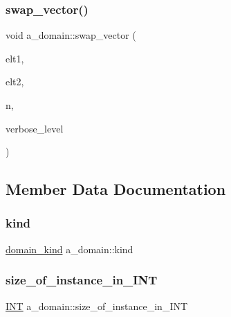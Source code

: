 \mbox{\label{classa__domain_a89310f090dde15d1fca545ae87aadcbc}} 
\subsubsection{\texorpdfstring{swap\+\_\+vector()}{swap\_vector()}}
{\footnotesize\ttfamily void a\+\_\+domain\+::swap\+\_\+vector (\begin{DoxyParamCaption}\item[{\mbox{\hyperlink{galois_8h_a09fddde158a3a20bd2dcadb609de11dc}{I\+NT}} $\ast$}]{elt1,  }\item[{\mbox{\hyperlink{galois_8h_a09fddde158a3a20bd2dcadb609de11dc}{I\+NT}} $\ast$}]{elt2,  }\item[{\mbox{\hyperlink{galois_8h_a09fddde158a3a20bd2dcadb609de11dc}{I\+NT}}}]{n,  }\item[{\mbox{\hyperlink{galois_8h_a09fddde158a3a20bd2dcadb609de11dc}{I\+NT}}}]{verbose\+\_\+level }\end{DoxyParamCaption})}



\subsection{Member Data Documentation}
\mbox{\label{classa__domain_ae171c12ea2d65d6d228a9dc957353359}} 
\subsubsection{\texorpdfstring{kind}{kind}}
{\footnotesize\ttfamily \mbox{\hyperlink{galois_8h_a3e2ab83f5066fe3dff37ac39cc40c140}{domain\+\_\+kind}} a\+\_\+domain\+::kind}

\mbox{\label{classa__domain_a9d423d4d842c893315b9d3873ce8e2fb}} 
\subsubsection{\texorpdfstring{size\+\_\+of\+\_\+instance\+\_\+in\+\_\+\+I\+NT}{size\_of\_instance\_in\_INT}}
{\footnotesize\ttfamily \mbox{\hyperlink{galois_8h_a09fddde158a3a20bd2dcadb609de11dc}{I\+NT}} a\+\_\+domain\+::size\+\_\+of\+\_\+instance\+\_\+in\+\_\+\+I\+NT}



